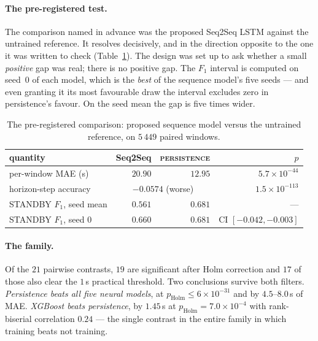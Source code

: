 \paragraph{The pre-registered test.}
The comparison named in advance was the proposed Seq2Seq LSTM against
the untrained reference. It resolves decisively, and in the direction
opposite to the one it was written to check
(Table~\ref{tab:sig:headline}). The design was set up to ask whether a
small \emph{positive} gap was real; there is no positive gap. The $F_1$
interval is computed on seed~$0$ of each model, which is the
\emph{best} of the sequence model's five seeds --- and even granting it
its most favourable draw the interval excludes zero in persistence's
favour. On the seed mean the gap is five times wider.

\begin{table}[t]
\centering
\caption{The pre-registered comparison: proposed sequence model versus
the untrained reference, on $5\,449$ paired windows.}
\label{tab:sig:headline}
\small
\begin{tabular}{@{}lrrr@{}}
\toprule
quantity & Seq2Seq & \textsc{persistence} & $p$ \\
\midrule
per-window MAE (s)        & $20.90$ & $12.95$ & $5.7\times10^{-44}$ \\
horizon-step accuracy     & \multicolumn{2}{c}{$-0.0574$ (worse)} & $1.5\times10^{-113}$ \\
STANDBY $F_1$, seed mean  & $0.561$ & $0.681$ & --- \\
STANDBY $F_1$, seed 0     & $0.660$ & $0.681$ & CI $[-0.042,-0.003]$ \\
\bottomrule
\end{tabular}
\end{table}

\paragraph{The family.}
Of the $21$ pairwise contrasts, $19$ are significant after Holm
correction and $17$ of those also clear the $1$\,s practical threshold.
Two conclusions survive both filters. \emph{Persistence beats all five
neural models}, at $p_{\text{Holm}}\le6\times10^{-31}$ and by $4.5$--$8.0$\,s of
MAE. \emph{XGBoost beats persistence}, by $1.45$\,s at
$p_{\text{Holm}}=7.0\times10^{-4}$ with rank-biserial correlation
$0.24$ --- the single contrast in the entire family in which training
beats not training.

